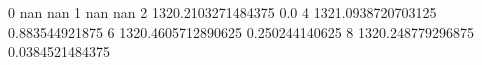0 nan nan
1 nan nan
2 1320.2103271484375 0.0
4 1321.0938720703125 0.883544921875
6 1320.4605712890625 0.250244140625
8 1320.248779296875 0.0384521484375
